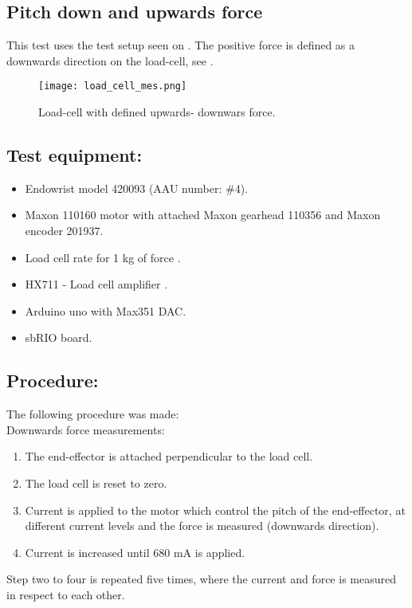 \subsection{Pitch down and upwards force} %
This test uses the test setup seen on . The positive force is defined as a downwards direction on the load-cell, see .

\begin{figure}[H]
	\centering
	\texttt{[image: load\_cell\_mes.png]}
	\caption{Load-cell with defined upwards- downwars force.}
	\label{fig:mes_up_down}
\end{figure}


\subsection*{Test equipment:}
\begin{itemize}
\item Endowrist model 420093 (AAU number: \#4).
\item Maxon 110160 motor with attached Maxon gearhead 110356 and Maxon encoder 201937.
\item Load cell rate for 1 kg of force \cite{Load_cell_1kg}.
\item HX711 - Load cell amplifier \cite{HX711}.
\item Arduino uno with Max351 DAC.
\item sbRIO board.
\end{itemize}

\subsection*{Procedure:}
The following procedure was made:\\
Downwards force measurements:
\begin{enumerate}
\item The end-effector is attached perpendicular to the load cell. 
\item The load cell is reset to zero.
\item Current is applied to the motor which control the pitch of the end-effector, at different current levels and the force is measured (downwards direction).
\item Current is increased until 680 mA is applied.
\end{enumerate}
Step two to four is repeated five times, where the current and force is measured in respect to each other. 

